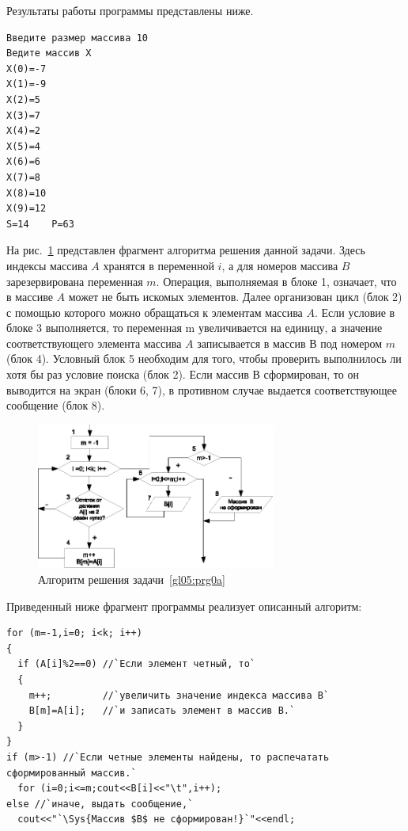 Результаты работы программы представлены ниже.
\begin{verbatim}
Введите размер массива 10 
Ведите массив Х 
X(0)=-7 
X(1)=-9 
X(2)=5 
X(3)=7 
X(4)=2 
X(5)=4 
X(6)=6 
X(7)=8 
X(8)=10 
X(9)=12 
S=14	P=63 
\end{verbatim}


На рис.~\ref{ch05:refDrawing6a} представлен фрагмент алгоритма решения данной задачи. 
Здесь индексы массива $A$ хранятся в переменной $i$, а для номеров массива $B$ 
зарезервирована переменная $m$. Операция, выполняемая в блоке 1, означает, 
что в массиве $A$ может не быть искомых элементов. Далее организован цикл (блок 2) 
с помощью которого можно обращаться к элементам массива $A$. Если условие в блоке 3 
выполняется, то переменная m увеличивается на единицу, а значение соответствующего 
элемента массива $A$ записывается в массив В под номером $m$ (блок 4). Условный блок 5 
необходим для того, чтобы проверить выполнилось ли хотя бы раз условие поиска (блок 2). 
Если массив В сформирован, то он выводится на экран (блоки 6, 7), в противном случае 
выдается соответствующее сообщение (блок 8).

\begin{figure}[h]
\begin{center}
\includegraphics[width=0.7\textwidth]{img/ris_5_7a}
\caption{Алгоритм решения задачи~\ref{gl05:prg0a}}
\label{ch05:refDrawing6a}
\end{center}
\end{figure}

Приведенный ниже фрагмент программы реализует описанный алгоритм:
\begin{lstlisting}
for (m=-1,i=0; i<k; i++)
{
  if (A[i]%2==0) //`Если элемент четный, то`
  {
    m++;         //`увеличить значение индекса массива В` 
    B[m]=A[i];   //`и записать элемент в массив В.`
  }
}
if (m>-1) //`Если четные элементы найдены, то распечатать сформированный массив.`
  for (i=0;i<=m;cout<<B[i]<<"\t",i++);
else //`иначе, выдать сообщение,`
  cout<<"`\Sys{Массив $B$ не сформирован!}`"<<endl; 
\end{lstlisting}

